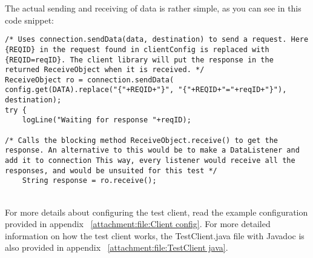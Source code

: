     The actual sending and receiving of data is rather simple, as you can see in this code snippet:
    \lstset{language=Java, style=eclipse}
    \lstset{frame=single}
    \lstset{breaklines=true}
    \lstset{showstringspaces=false}
    \begin{lstlisting}
/* Uses connection.sendData(data, destination) to send a request. Here {REQID} in the request found in clientConfig is replaced with {REQID=reqID}. The client library will put the response in the returned ReceiveObject when it is received. */
ReceiveObject ro = connection.sendData(
config.get(DATA).replace("{"+REQID+"}", "{"+REQID+"="+reqID+"}"), destination);
try {
    logLine("Waiting for response "+reqID);

/* Calls the blocking method ReceiveObject.receive() to get the response. An alternative to this would be to make a DataListener and add it to connection This way, every listener would receive all the responses, and would be unsuited for this test */
    String response = ro.receive();
    \end{lstlisting}
    \\
    For more details about configuring the test client, read the example configuration provided in appendix ~\ref{attachment:file:Client config}. For more detailed information on how the test client works, the TestClient.java file with Javadoc is also provided in appendix ~\ref{attachment:file:TestClient java}.

